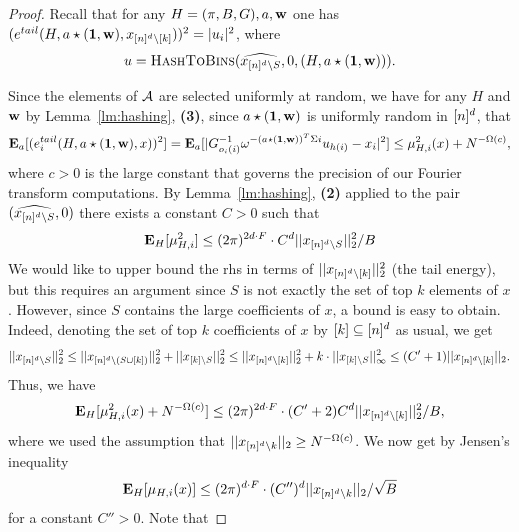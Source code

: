 \begin{proof}

Recall that for any $H=(\pi, B, G), a, \mathbf{w}$ one has $(e^{tail}(H, a\star (\mathbf{1}, \mathbf{w}), x_{{[n]^d}\setminus [k]}))^2=|u_i|^2$, where 
$$
u =\Call{HashToBins}{\widehat{x_{\nsq\setminus S}}, 0, (H, a\star (\one, \h))}.
$$

Since the elements of ${\mathcal{A}}$ are selected uniformly at random, we have for any $H$ and $\mathbf{w}$ by Lemma~\ref{lm:hashing}, {\bf (3)}, since $a\star (\mathbf{1}, \mathbf{w})$ is uniformly random in ${[n]^d}$, that
\begin{equation}\label{eq:expect-a-0hg443g}
{\bf \mbox{\bf E}}_a[(e^{tail}_i(H, a\star (\mathbf{1}, \mathbf{w}), x))^2]={\bf \mbox{\bf E}}_{a}[|G_{o_i(i)}^{-1}\omega^{-(a\star (\mathbf{1}, \mathbf{w}))^T\Sigma i}u_{h(i)} - x_i|^2]\leq \mu^2_{H, i}(x)+N^{-\Omega(c)},
\end{equation}
where $c>0$ is the large constant that governs the precision of our Fourier transform computations. 
By Lemma~\ref{lm:hashing}, {\bf (2)} applied to the pair $(\widehat{x_{{[n]^d}\setminus S}}, 0)$ there exists a constant $C>0$ such that
$$
{\bf \mbox{\bf E}}_H[\mu^2_{H, i}] \leq  (2\pi)^{2d\cdot F}\cdot C^d ||x_{{[n]^d} \setminus S}||_2^2/B
$$ 
We would like to upper bound the rhs in terms of $||x_{{[n]^d}\setminus [k]}||_2^2$ (the tail energy), but this requires an argument since $S$ is not exactly the set of top $k$ elements of $x$. However, since $S$ contains the large coefficients of $x$, a bound is easy to obtain. Indeed, denoting the set of top $k$ coefficients of $x$ by $[k]\subseteq {[n]^d}$ as usual, we get
\begin{equation*}
||x_{{[n]^d} \setminus S}||_2^2\leq ||x_{{[n]^d} \setminus (S\cup [k])}||_2^2+||x_{[k]\setminus S}||_2^2\leq ||x_{{[n]^d} \setminus [k]}||_2^2+k\cdot ||x_{[k]\setminus S}||_\infty^2\leq (C'+1)||x_{{[n]^d} \setminus [k]}||_2.
\end{equation*}
Thus, we have  
\begin{equation*}
{\bf \mbox{\bf E}}_H[\mu^2_{H, i}(x)+N^{-\Omega(c)}]\leq (2\pi)^{2d\cdot F}\cdot (C'+2)C^d ||x_{{[n]^d} \setminus [k]}||_2^2/B,
\end{equation*}
where we used the assumption that $||x_{{[n]^d} \setminus k}||_2\geq N^{-\Omega(c)}$.
We now get by Jensen's inequality 
\begin{equation}\label{eq:mu-b}
{\bf \mbox{\bf E}}_H[\mu_{H, i}(x)]\leq(2\pi)^{d\cdot F}\cdot (C'')^d ||x_{{[n]^d} \setminus k}||_2/\sqrt{B}
\end{equation}
for a constant $C''>0$. Note that 



\end{proof}
